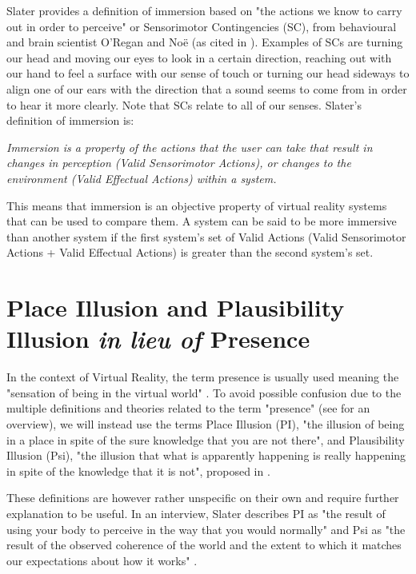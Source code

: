 Slater provides a definition of immersion based on "the actions we know to carry out in order to perceive" or Sensorimotor Contingencies (SC), from behavioural and brain scientist O'Regan and Noë (as cited in \parencite{Slater2009}). Examples of SCs are turning our head and moving our eyes to look in a certain direction, reaching out with our hand to feel a surface with our sense of touch or turning our head sideways to align one of our ears with the direction that a sound seems to come from in order to hear it more clearly. Note that SCs relate to all of our senses. Slater's definition of immersion is:

\begin{displayquote}
\textit{Immersion is a property of the actions that the user can take that result in changes in perception (Valid Sensorimotor Actions), or changes to the environment (Valid Effectual Actions) within a system.} \parencite{Slater2009}
\end{displayquote}

This means that immersion is an objective property of virtual reality systems that can be used to compare them. A system can be said to be more immersive than another system if the first system's set of Valid Actions (Valid Sensorimotor Actions + Valid Effectual Actions) is greater than the second system's set.


\section{Place Illusion and Plausibility Illusion \textit{in lieu of} Presence}
\label{sec:PIandPsi}

In the context of Virtual Reality, the term presence is usually used meaning the "sensation of being in the virtual world" \parencite{Schuemie2001}. To avoid possible confusion due to the multiple definitions and theories related to the term "presence" (see \parencite{Schuemie2001} for an overview), we will instead use the terms Place Illusion (PI), "the illusion of being in a place in spite of the sure knowledge that you are not there", and Plausibility Illusion (Psi), "the illusion that what is apparently happening is really happening in spite of the knowledge that it is not", proposed in \parencite{Slater2009}.

These definitions are however rather unspecific on their own and require further explanation to be useful. In an interview, Slater describes PI as "the result of using your body to perceive in the way that you would normally" and Psi as "the result of the observed coherence of the world and the extent to which it matches our expectations about how it works" \parencite{Slater2015}.

